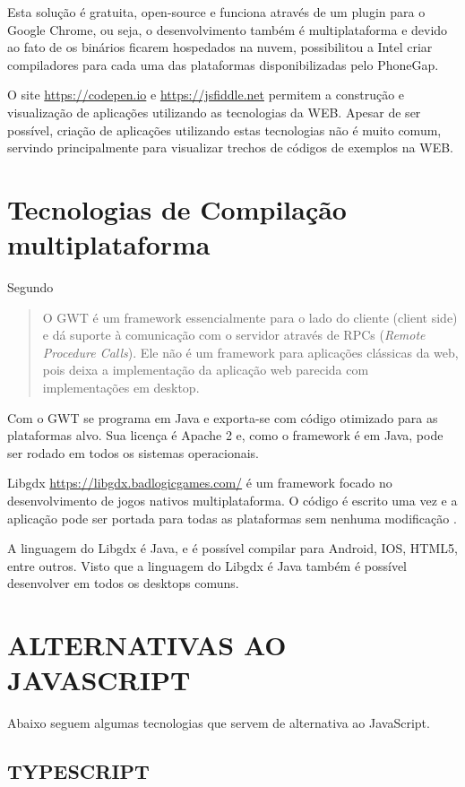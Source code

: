 Esta solução é gratuita, open-source e funciona através de um
plugin para o Google Chrome, ou seja, o desenvolvimento também é
multiplataforma e devido ao fato de os binários ficarem hospedados
na nuvem, possibilitou a Intel criar compiladores para cada uma das
plataformas disponibilizadas pelo PhoneGap.

O site \url{https://codepen.io} e \url{https://jsfiddle.net} permitem a
construção e visualização de aplicações utilizando as tecnologias
da WEB. Apesar de ser possível, criação de aplicações utilizando
estas tecnologias não é muito comum, servindo principalmente para
visualizar trechos de códigos de exemplos na WEB.


\chapter{Tecnologias de Compilação multiplataforma}

Segundo \cite[pp. 29]{gtw}
\begin{quote}
O GWT é um framework essencialmente para o lado do cliente (client
side) e dá suporte à comunicação com o servidor através de RPCs
(\textit{Remote Procedure Calls}). Ele não é um framework para
aplicações clássicas da web, pois deixa a implementação da
aplicação web parecida com implementações em desktop.
\end{quote}

Com o GWT se programa em Java e exporta-se com código otimizado para
as plataformas alvo. Sua licença é Apache 2 e, como o framework é em Java,
pode ser rodado em todos os sistemas operacionais.

Libgdx \url{https://libgdx.badlogicgames.com/} é um framework
focado no desenvolvimento de jogos nativos multiplataforma. O
código é escrito uma vez e a aplicação pode ser portada para
todas as plataformas sem nenhuma modificação \autocite[pp.
8]{crossPlatformMobileGameDevelopment}.

A linguagem do Libgdx é Java, e é possível compilar para Android,
IOS, HTML5, entre outros. Visto que a linguagem do Libgdx é Java
também é possível desenvolver em todos os desktops comuns.

\chapter{ALTERNATIVAS AO JAVASCRIPT}

Abaixo seguem algumas tecnologias que servem de alternativa ao
JavaScript.

\section{TYPESCRIPT}

